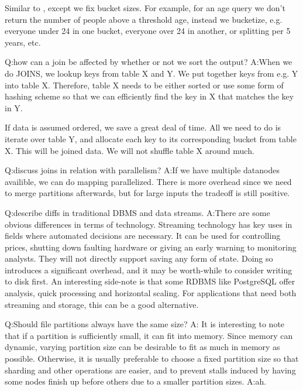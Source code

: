 \begin{definition}
    Similar to , except we fix bucket sizes.
    For example, for an age query we don't return the number of people above a threshold age,
    instead we bucketize, e.g. everyone under 24 in one bucket, everyone over 24 in another,
    or splitting per 5 years, etc.
\end{definition}


Q:\@ how can a join be affected by whether or not we sort the output?
\newline A:\@ When we do JOINS, we lookup keys from table X and Y. We put together keys from e.g. Y into table X. Therefore, table X needs to be either sorted or use some form of hashing scheme so that we can efficiently find the key in X that matches the key in Y.

If data is assumed ordered, we save a great deal of time. All we need to do is iterate over table Y, and allocate each key to its corresponding bucket from table X. This will be joined data. We will not shuffle table X around much.  

Q:\@ discuss joins in relation with parallelism?
\newline A:\@ If we have multiple datanodes availible, we can do mapping 
parallelized. There is more overhead since we need to merge partitions afterwards,
but for large inputs the tradeoff is still positive.

Q:\@ describe diffs in traditional DBMS and data streams.
\newline A:\@ There are some obvious differences in terms of technology. Streaming technology has key uses 
in fields where automated decisions are necessary. It can be used for controlling prices, 
shutting down faulting hardware or giving an early warning to monitoring analysts.
They will not directly  support saving any form of state. Doing so introduces a significant overhead,
and it may be worth-while to consider writing to disk first. 
An interesting side-note is that some RDBMS like PostgreSQL offer  analysis, quick processing and horizontal scaling. For applications that need both streaming and storage, this can
be a good alternative.

Q:\@ Should file partitions always have the same size?
A:\@
It is interesting to note that if a partition is sufficiently small, it can fit into memory.
Since memory can dynamic, varying partition size can be desirable to fit as much in memory as possible.
Otherwise, it is usually preferable to choose a fixed partition size so that sharding and 
other operations are easier, and to prevent stalls induced by having some nodes finish up
before others due to a smaller partition sizes.
\newline A:\@ ah.

